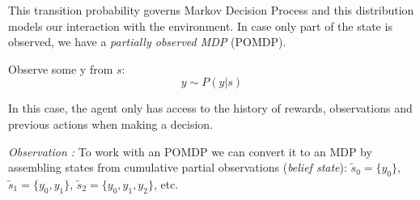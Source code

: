 \documentclass{article}
\begin{document}

This transition probability governs Markov Decision Process and this distribution models our interaction with the environment. In case only part of the state is observed, we have a \textit{partially observed MDP} (POMDP).

\begin{defn}
Observe some y from $s$:\[
y\sim P(y|s)
\]
\end{defn}
In this case, the agent only has access to the history of rewards, observations and previous actions when making a decision.

\textit{Observation :} To work with an POMDP we can convert it to an MDP by assembling states from cumulative partial observations (\textit{belief state}): $\tilde s_{0}=\{y_{0}\}$, $\tilde s_{1}=\{y_{0},y_{1}\}$, $\tilde s_{2}=\{y_{0},y_{1},y_{2}\}$, etc. \\
\end{document}
